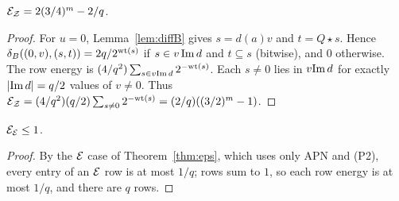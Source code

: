\begin{lemma}\label{lem:UEZ}
$\mathcal E_{\mathcal{Z}}=2(3/4)^m-2/q$.
\end{lemma}
\begin{proof}
For $u=0$, Lemma~\ref{lem:diffB} gives $s=d(a)v$ and $t=Q\star s$. Hence
$\delta_B((0,v),(s,t))=2q/2^{\mathrm{wt}(s)}$ if $s\in v\,\mathrm{Im}\, d$ and $t\subseteq s$ (bitwise), and $0$ otherwise. The
row energy is $(4/q^2)\sum_{s\in v\mathrm{Im}\, d}2^{-\mathrm{wt}(s)}$. Each $s\ne0$ lies in $v\mathrm{Im}\, d$ for exactly $|\mathrm{Im}\, d|=q/2$
values of $v\ne0$. Thus $\mathcal E_{\mathcal{Z}}=(4/q^2)(q/2)\sum_{s\ne0}2^{-\mathrm{wt}(s)}=(2/q)((3/2)^m-1)$.
\end{proof}

\begin{lemma}[$\cE$ rows]\label{lem:UEE}
$\mathcal E_{\mathcal{E}}\le1$.
\end{lemma}
\begin{proof}
By the $\cE$ case of Theorem~\ref{thm:eps}, which uses only APN and (P2), every entry of an $\cE$ row is at
most $1/q$; rows sum to $1$, so each row energy is at most $1/q$, and there are $q$ rows.
\end{proof}

